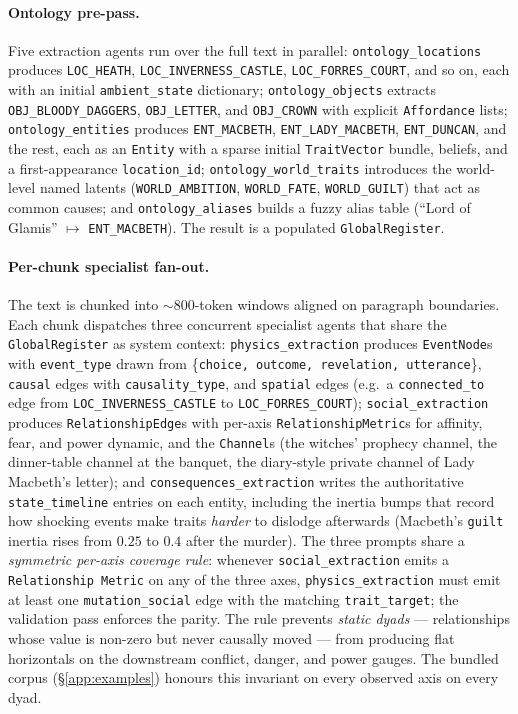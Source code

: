 \documentclass[11pt]{article}
\begin{document}
\paragraph{Ontology pre-pass.} Five extraction agents run over the
full text in parallel: \texttt{ontology\_locations} produces
\texttt{LOC\_HEATH}, \texttt{LOC\_INVERNESS\_CASTLE},
\texttt{LOC\_FORRES\_COURT}, and so on, each with an initial
\texttt{ambient\_state} dictionary; \texttt{ontology\_objects}
extracts \texttt{OBJ\_BLOODY\_DAGGERS},
\texttt{OBJ\_LETTER}, and \texttt{OBJ\_CROWN} with explicit
\texttt{Affordance} lists; \texttt{ontology\_entities} produces
\texttt{ENT\_MACBETH}, \texttt{ENT\_LADY\_MACBETH},
\texttt{ENT\_DUNCAN}, and the rest, each as an \texttt{Entity}
with a sparse initial \texttt{TraitVector} bundle, beliefs, and a
first-appearance \texttt{location\_id};
\texttt{ontology\_world\_traits} introduces the world-level
named latents (\texttt{WORLD\_AMBITION},
\texttt{WORLD\_FATE}, \texttt{WORLD\_GUILT}) that act as common
causes; and \texttt{ontology\_aliases} builds a fuzzy alias table
(``Lord of Glamis'' $\mapsto$ \texttt{ENT\_MACBETH}). The result
is a populated \texttt{GlobalRegister}.

\paragraph{Per-chunk specialist fan-out.} The text is chunked into
$\sim 800$-token windows aligned on paragraph boundaries. Each
chunk dispatches three concurrent specialist agents that share the
\texttt{GlobalRegister} as system context: \texttt{physics\_extraction}
produces \texttt{EventNode}s with \texttt{event\_type} drawn from
\{\texttt{choice, outcome, revelation, utterance}\},
\texttt{causal} edges with \texttt{causality\_type}, and
\texttt{spatial} edges (e.g.\ a \texttt{connected\_to} edge from
\texttt{LOC\_INVERNESS\_CASTLE} to \texttt{LOC\_FORRES\_COURT});
\texttt{social\_extraction} produces \texttt{RelationshipEdge}s
with per-axis \texttt{RelationshipMetric}s for affinity, fear, and
power dynamic, and the \texttt{Channel}s (the witches' prophecy
channel, the dinner-table channel at the banquet, the diary-style
private channel of Lady Macbeth's letter); and
\texttt{consequences\_extraction} writes the authoritative
\texttt{state\_timeline} entries on each entity, including the
inertia bumps that record how shocking events make traits
\emph{harder} to dislodge afterwards (Macbeth's \texttt{guilt}
inertia rises from $0.25$ to $0.4$ after the murder).
The three prompts share a \emph{symmetric per-axis coverage rule}:
whenever \texttt{social\_extraction} emits a \texttt{Relationship%
Metric} on any of the three axes, \texttt{physics\_extraction}
must emit at least one \texttt{mutation\_social} edge with the
matching \texttt{trait\_target}; the validation pass enforces the
parity. The rule prevents \emph{static dyads} --- relationships
whose value is non-zero but never causally moved --- from
producing flat horizontals on the downstream conflict, danger,
and power gauges. The bundled corpus
(\S\ref{app:examples}) honours this invariant on every observed
axis on every dyad.
\end{document}
